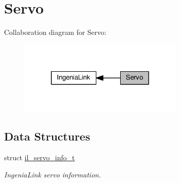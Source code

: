 \hypertarget{group__IL__SERVO}{}\section{Servo}
\label{group__IL__SERVO}
Collaboration diagram for Servo\+:\nopagebreak
\begin{figure}[H]
\begin{center}
\leavevmode
\includegraphics[width=224pt]{group__IL__SERVO}
\end{center}
\end{figure}
\subsection*{Data Structures}
\begin{DoxyCompactItemize}
\item 
struct \hyperlink{structil__servo__info__t}{il\+\_\+servo\+\_\+info\+\_\+t}
\begin{DoxyCompactList}\small\item\em Ingenia\+Link servo information. \end{DoxyCompactList}\end{DoxyCompactItemize}
